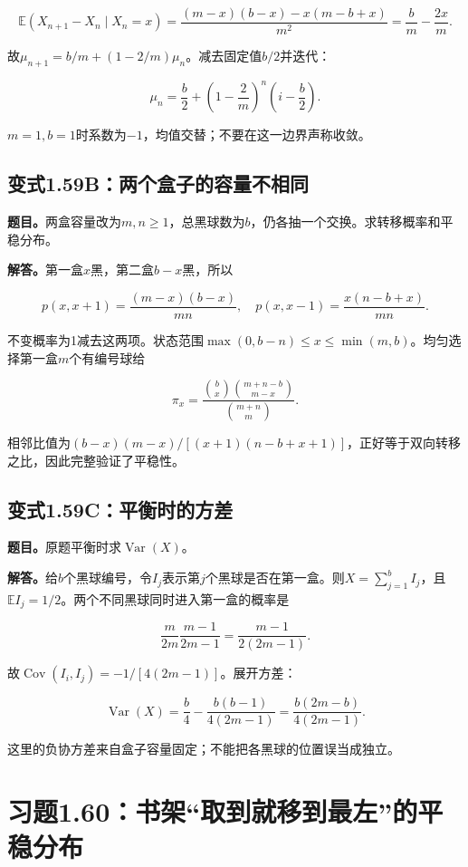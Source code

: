 \documentclass[
  11pt,a4paper,UTF8,fontset=fandol]{ctexart}
\begin{document}
\[
\mathbb E(X_{n+1}-X_n\mid X_n=x)
=\frac{(m-x)(b-x)-x(m-b+x)}{m^2}
=\frac bm-\frac{2x}m.
\]

故\(\mu_{n+1}=b/m+(1-2/m)\mu_n\)。减去固定值\(b/2\)并迭代：

\[
\boxed{\mu_n=\frac b2+\left(1-\frac2m\right)^n\left(i-\frac b2\right).}
\]

\(m=1,b=1\)时系数为\(-1\)，均值交替；不要在这一边界声称收敛。

\subsection{变式1.59B：两个盒子的容量不相同}\label{ux53d8ux5f0f1.59bux4e24ux4e2aux76d2ux5b50ux7684ux5bb9ux91cfux4e0dux76f8ux540c}

\textbf{题目。}两盒容量改为\(m,n\ge1\)，总黑球数为\(b\)，仍各抽一个交换。求转移概率和平稳分布。

\textbf{解答。}第一盒\(x\)黑，第二盒\(b-x\)黑，所以

\[
p(x,x+1)=\frac{(m-x)(b-x)}{mn},\quad
p(x,x-1)=\frac{x(n-b+x)}{mn}.
\]

不变概率为1减去这两项。状态范围\(\max(0,b-n)\le x\le\min(m,b)\)。均匀选择第一盒\(m\)个有编号球给

\[
\boxed{\pi_x=\frac{\binom bx\binom{m+n-b}{m-x}}{\binom{m+n}m}.}
\]

相邻比值为\((b-x)(m-x)/[(x+1)(n-b+x+1)]\)，正好等于双向转移之比，因此完整验证了平稳性。

\subsection{变式1.59C：平衡时的方差}\label{ux53d8ux5f0f1.59cux5e73ux8861ux65f6ux7684ux65b9ux5dee}

\textbf{题目。}原题平衡时求\(\operatorname{Var}(X)\)。

\textbf{解答。}给\(b\)个黑球编号，令\(I_j\)表示第\(j\)个黑球是否在第一盒。则\(X=\sum_{j=1}^bI_j\)，且\(\mathbb EI_j=1/2\)。两个不同黑球同时进入第一盒的概率是

\[
\frac m{2m}\frac{m-1}{2m-1}=\frac{m-1}{2(2m-1)}.
\]

故\(\operatorname{Cov}(I_i,I_j)=-1/[4(2m-1)]\)。展开方差：

\[
\operatorname{Var}(X)=\frac b4-\frac{b(b-1)}{4(2m-1)}
=\boxed{\frac{b(2m-b)}{4(2m-1)}}.
\]

这里的负协方差来自盒子容量固定；不能把各黑球的位置误当成独立。

\section{习题1.60：书架``取到就移到最左''的平稳分布}\label{ux4e60ux98981.60ux4e66ux67b6ux53d6ux5230ux5c31ux79fbux5230ux6700ux5de6ux7684ux5e73ux7a33ux5206ux5e03}
\end{document}

